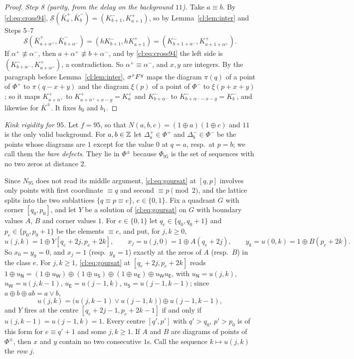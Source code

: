 \begin{proof}
\emph{Step 8 (parity, from the delay on the background $11$).} Take $a\equiv b$. By \eqref{cl:eq:cross94}, $\mathcal S(\bar K^+_a,\bar K^-_b)=(K^-_{b+1},K^+_{a+1})$, so by Lemma~\ref{cl:lem:inter} and Steps 5--7
\[
\mathcal S(\bar K^+_{a+\alpha^+},\bar K^-_{b+\alpha^-})=(hK^-_{b+1},hK^+_{a+1})=(K^-_{b+1+\alpha^-},K^+_{a+1+\alpha^+}).
\]
If $\alpha^+\not\equiv\alpha^-$, then $a+\alpha^+\not\equiv b+\alpha^-$, and by \eqref{cl:eq:cross94} the left side is $(K^-_{b+\alpha^-},K^+_{a+\alpha^+})$, a contradiction. So $\alpha^+\equiv\alpha^-$, and $x,y$ are integers. By the paragraph before Lemma~\ref{cl:lem:inter}, $\sigma^xF^y$ maps the diagram $\pi(q)$ of a point of $\Phi^+$ to $\pi(q-x+y)$ and the diagram $\xi(p)$ of a point of $\Phi^-$ to $\xi(p+x+y)$; so it maps $K^+_{a+\alpha^+}$ to $K^+_{a+\alpha^++x-y}=K^+_a$ and $K^-_{b+\alpha^-}$ to $K^-_{b+\alpha^--x-y}=K^-_b$, and likewise for $\bar K^\pm$. It fixes $b_0$ and $b_1$.
\end{proof}

\emph{Kink rigidity for $95$.} Let $f=95$, so that $N(a,b,c)=(1\oplus a)(1\oplus c)$ and $11$ is the only valid background. For $a,b\in\mathbb{Z}$ let $\Delta^+_a\in\Phi^+$ and $\Delta^-_b\in\Phi^-$ be the points whose diagrams are $1$ except for the value $0$ at $q=a$, resp.\ at $p=b$; we call them the \emph{bare defects}. They lie in $\Phi^\pm$ because $\Phi_{95}$ is the set of sequences with no two zeros at distance $2$.

Since $N_{95}$ does not read its middle argument, \eqref{cl:eq:goursat} at $[q,p]$ involves only points with first coordinate $\equiv q$ and second $\equiv p\pmod2$, and the lattice splits into the two sublattices $\{q\equiv p\equiv e\}$, $e\in\{0,1\}$. Fix a quadrant $G$ with corner $[q_0,p_0]$, and let $Y$ be a solution of \eqref{cl:eq:goursat} on $G$ with boundary values $A$, $B$ and corner values $1$. For $e\in\{0,1\}$ let $q_e\in\{q_0,q_0+1\}$ and $p_e\in\{p_0,p_0+1\}$ be the elements $\equiv e$, and put, for $j,k\ge0$,
\[
u(j,k)=1\oplus Y[q_e+2j,p_e+2k],\qquad x_j=u(j,0)=1\oplus A(q_e+2j),\qquad y_k=u(0,k)=1\oplus B(p_e+2k).
\]
So $x_0=y_0=0$, and $x_j=1$ (resp.\ $y_k=1$) exactly at the zeros of $A$ (resp.\ $B$) in the class $e$. For $j,k\ge1$, \eqref{cl:eq:goursat} at $[q_e+2j,p_e+2k]$ reads $1\oplus u_{\mathsf N}=(1\oplus u_{\mathsf W})\oplus(1\oplus u_{\mathsf S})\oplus(1\oplus u_{\mathsf E})\oplus u_{\mathsf W}u_{\mathsf E}$, with $u_{\mathsf N}=u(j,k)$, $u_{\mathsf W}=u(j,k-1)$, $u_{\mathsf E}=u(j-1,k)$, $u_{\mathsf S}=u(j-1,k-1)$; since $a\oplus b\oplus ab=a\vee b$,
\begin{equation}\label{cl:eq:half95}
u(j,k)=\bigl(u(j,k-1)\vee u(j-1,k)\bigr)\oplus u(j-1,k-1),
\end{equation}
and $Y$ fires at the centre $[q_e+2j-1,p_e+2k-1]$ if and only if $u(j,k-1)=u(j-1,k)=1$. Every centre $[q',p']$ with $q'>q_0$, $p'>p_0$ is of this form for $e\equiv q'+1$ and some $j,k\ge1$. If $A$ and $B$ are diagrams of points of $\Phi^\pm$, then $x$ and $y$ contain no two consecutive $1$s. Call the sequence $k\mapsto u(j,k)$ the \emph{row} $j$.

